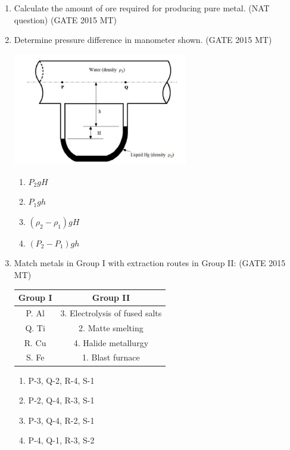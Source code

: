 \documentclass[12pt]{article}
\begin{document}
\begin{enumerate}
\item Calculate the amount of ore required for producing pure metal. (NAT question) (GATE 2015 MT)

\item Determine pressure difference in manometer shown. (GATE 2015 MT)
\begin{center}
  \includegraphics[width=0.6\textwidth]{images/q44i.jpg}
\end{center}
\begin{enumerate}[label=(\alph*)]
  \item $P_2 g H$
  \item $P_1 g h$
  \item $(\rho_2 - \rho_1) g H$
  \item $(P_2 - P_1) g h$
\end{enumerate}

\item Match metals in Group I with extraction routes in Group II: (GATE 2015 MT)
\begin{table}[h]
\centering
\begin{tabular}{|c|c|}
\hline
Group I & Group II \\
\hline
P. Al & 3. Electrolysis of fused salts\\
Q. Ti & 2. Matte smelting \\
R. Cu & 4. Halide metallurgy \\
S. Fe & 1. Blast furnace \\
\hline
\end{tabular}
\end{table}
\begin{enumerate}[label=(\alph*)]
  \item P-3, Q-2, R-4, S-1
  \item P-2, Q-4, R-3, S-1
  \item P-3, Q-4, R-2, S-1
  \item P-4, Q-1, R-3, S-2
\end{enumerate}


\end{enumerate}
\end{document}
